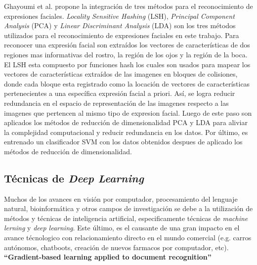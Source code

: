 Ghayoumi et al.  propone la integración de tres métodos para el reconocimiento de expresiones faciales. \textit{Locality Sensitive Hashing} (LSH), \textit{Principal Component Analysis} (PCA) y \textit{Linear Discriminant Analysis} (LDA)  son los tres métodos utilizados para el reconocimiento de expresiones faciales en este trabajo. Para reconocer una expresión facial son extraídos los vectores de características de dos regiones mas informativas del rostro, la región de los ojos y la región de la boca. El LSH esta compuesto por funciones hash los cuales son usados para mapear los vectores de características extraídos de las imagenes en bloques de colisiones, donde cada bloque esta registrado como la locación de vectores de características pertenecientes a una específica expresión facial a priori. Así, se logra reducir redundancia en el espacio de representación de las imagenes respecto a las imagenes que pertencen al mismo tipo de expresion facial. Luego de este paso son aplicados los métodos de reducción de dimensionalidad PCA y LDA  para aliviar la complejidad computacional y reducir redundancia en los datos. Por último, es entrenado un clasificador SVM con los datos obtenidos despues de aplicado los métodos de reducción de dimensionalidad.

\vspace{1cm}
\subsection{Técnicas de \textit{Deep Learning}}

Muchos de los avances en visión por computador, procesamiento del lenguaje natural, bioinformática y otros campos de investigación se debe a la utilización de métodos y técnicas de inteligencia artificial, especificamente técnicas de \textit{machine lerning} y \textit{deep learning}. Este último, es el causante de una gran impacto en el avance técnologico con relacionamiento directo en el mundo comercial (e.g. carros autónomos, chatboots, creación de nuevos farmacos por computador, etc). 
\\

\textbf{“Gradient-based learning applied to document recognition” \cite{2lecun1998gradient}}\\

